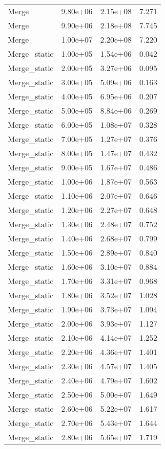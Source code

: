 \begin{table}
\begin{tabular}{llll}
Merge & 9.80e+06 & 2.15e+08 & 7.271 \\
Merge & 9.90e+06 & 2.18e+08 & 7.745 \\
Merge & 1.00e+07 & 2.20e+08 & 7.220 \\
Merge_static & 1.00e+05 & 1.54e+06 & 0.042 \\
Merge_static & 2.00e+05 & 3.27e+06 & 0.095 \\
Merge_static & 3.00e+05 & 5.09e+06 & 0.163 \\
Merge_static & 4.00e+05 & 6.95e+06 & 0.207 \\
Merge_static & 5.00e+05 & 8.84e+06 & 0.269 \\
Merge_static & 6.00e+05 & 1.08e+07 & 0.328 \\
Merge_static & 7.00e+05 & 1.27e+07 & 0.376 \\
Merge_static & 8.00e+05 & 1.47e+07 & 0.432 \\
Merge_static & 9.00e+05 & 1.67e+07 & 0.486 \\
Merge_static & 1.00e+06 & 1.87e+07 & 0.563 \\
Merge_static & 1.10e+06 & 2.07e+07 & 0.646 \\
Merge_static & 1.20e+06 & 2.27e+07 & 0.648 \\
Merge_static & 1.30e+06 & 2.48e+07 & 0.752 \\
Merge_static & 1.40e+06 & 2.68e+07 & 0.799 \\
Merge_static & 1.50e+06 & 2.89e+07 & 0.840 \\
Merge_static & 1.60e+06 & 3.10e+07 & 0.884 \\
Merge_static & 1.70e+06 & 3.31e+07 & 0.968 \\
Merge_static & 1.80e+06 & 3.52e+07 & 1.028 \\
Merge_static & 1.90e+06 & 3.73e+07 & 1.094 \\
Merge_static & 2.00e+06 & 3.93e+07 & 1.127 \\
Merge_static & 2.10e+06 & 4.14e+07 & 1.252 \\
Merge_static & 2.20e+06 & 4.36e+07 & 1.401 \\
Merge_static & 2.30e+06 & 4.57e+07 & 1.405 \\
Merge_static & 2.40e+06 & 4.79e+07 & 1.602 \\
Merge_static & 2.50e+06 & 5.00e+07 & 1.649 \\
Merge_static & 2.60e+06 & 5.22e+07 & 1.617 \\
Merge_static & 2.70e+06 & 5.43e+07 & 1.644 \\
Merge_static & 2.80e+06 & 5.65e+07 & 1.719 \\

\end{tabular}
\end{table}
